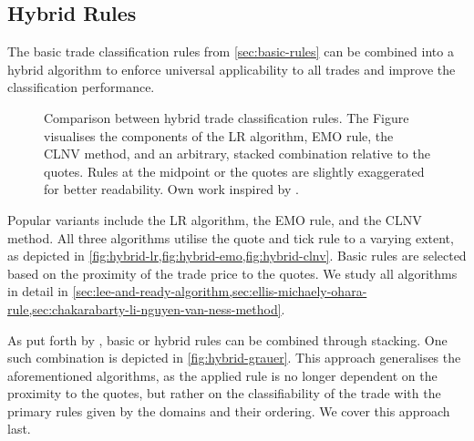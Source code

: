 \subsection{Hybrid Rules}\label{sec:hybrid-rules}

The basic trade classification rules from \cref{sec:basic-rules} can be combined into a hybrid algorithm to enforce universal applicability to all trades and improve the classification performance.


\begin{figure}[ht!]
    \hfill
    \hfill\null
    \caption[Comparison Between Hybrid Trade Classification Rules]{Comparison between hybrid trade classification rules. The Figure visualises the components of the \acrshort{LR} algorithm, \acrshort{EMO} rule, the \acrshort{CLNV} method, and an arbitrary, stacked combination relative to the quotes. Rules at the midpoint or the quotes are slightly exaggerated for better readability. Own work inspired by \textcite[][167]{poppeSensitivityVPINChoice2016}.}
    \label{fig:hybrid-algorithms}
\end{figure}

Popular variants include the \gls{LR} algorithm, the \gls{EMO} rule, and the \gls{CLNV} method. All three algorithms utilise the quote and tick rule to a varying extent, as depicted in \cref{fig:hybrid-lr,fig:hybrid-emo,fig:hybrid-clnv}. Basic rules are selected based on the proximity of the trade price to the quotes. We study all algorithms in detail in \cref{sec:lee-and-ready-algorithm,sec:ellis-michaely-ohara-rule,sec:chakarabarty-li-nguyen-van-ness-method}.


As put forth by \textcite[][18]{grauerOptionTradeClassification2022}, basic or hybrid rules can be combined through stacking. One such combination is depicted in \cref{fig:hybrid-grauer}. This approach generalises the aforementioned algorithms, as the applied rule is no longer dependent on the proximity to the quotes, but rather on the classifiability of the trade with the primary rules given by the domains and their ordering. We cover this approach last.


